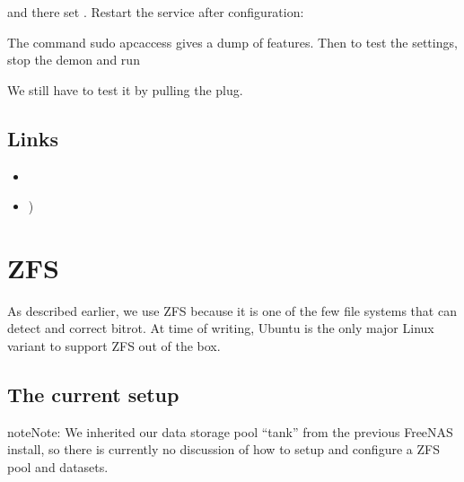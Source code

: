 \documentclass[a4paper,10pt,english]{sphinxmanual}
\begin{document}
and there set . Restart the service after configuration:

\begin{sphinxVerbatim}[commandchars=\\\{\}]
   
   
\end{sphinxVerbatim}

The command sudo apcaccess gives a dump of features. Then to test the settings, stop the demon and run

\begin{sphinxVerbatim}[commandchars=\\\{\}]
 
\end{sphinxVerbatim}

We still have to test it by pulling the plug.


\section{Links}
\label{\detokenize{ups:links}}\begin{itemize}
\item {} 

\item {} 
)

\end{itemize}


\chapter{ZFS}
\label{\detokenize{zfs:zfs}}\label{\detokenize{zfs::doc}}
As described earlier, we use ZFS because it is one of the few file systems that
can detect and correct bitrot. At time of writing, Ubuntu is the only major
Linux variant to support ZFS out of the box.


\section{The current setup}
\label{\detokenize{zfs:the-current-setup}}
\begin{sphinxadmonition}{note}{Note:}
We inherited our data storage pool “tank” from the previous FreeNAS
install, so there is currently no discussion of how to setup and
configure a ZFS pool and datasets.
\end{sphinxadmonition}
\end{document}
